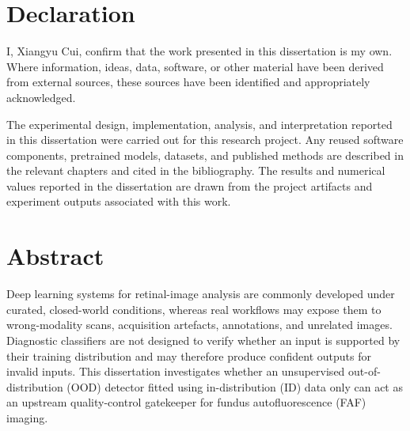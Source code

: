 \documentclass[fleqn,12pt]{olplainarticle}
\begin{document}
\setcounter{page}{1}

\section*{Declaration}
{}

I, Xiangyu Cui, confirm that the work presented in this dissertation is my
own. Where information, ideas, data, software, or other material have been
derived from external sources, these sources have been identified and
appropriately acknowledged.

The experimental design, implementation, analysis, and interpretation reported
in this dissertation were carried out for this research project. Any reused
software components, pretrained models, datasets, and published methods are
described in the relevant chapters and cited in the bibliography. The results
and numerical values reported in the dissertation are drawn from the project
artifacts and experiment outputs associated with this work.

\clearpage

\section*{Abstract}
{}

Deep learning systems for retinal-image analysis are commonly developed under
curated, closed-world conditions, whereas real workflows may expose them to
wrong-modality scans, acquisition artefacts, annotations, and unrelated
images. Diagnostic classifiers are not designed to verify whether an input is
supported by their training distribution and may therefore produce confident
outputs for invalid inputs. This dissertation investigates whether an
unsupervised out-of-distribution (OOD) detector fitted using in-distribution
(ID) data only can act as an upstream quality-control gatekeeper for fundus
autofluorescence (FAF) imaging.
\end{document}
